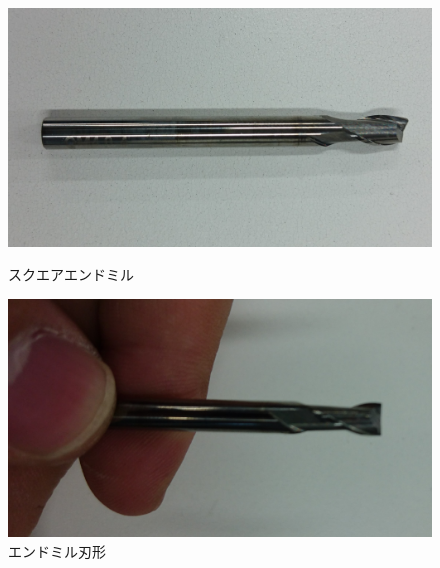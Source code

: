 \documentclass[b5paper, 9pt, twocolumn, titlepage,openany]{jsbook}%
\begin{document}
\begin{figure}[tbh]
  \begin{center}
    \begin{minipage}{0.4\columnwidth}
      \includegraphics[width=\columnwidth]{endmill.jpg}
      \caption{スクエアエンドミル    \label{endmill1}}
    \end{minipage}
    \hspace{0.05\columnwidth}
    \begin{minipage}{0.4\columnwidth}
      \includegraphics[width=\columnwidth]{endmill_side.jpg}
      \caption{エンドミル刃形    \label{endmill2}}
    \end{minipage}
  \end{center}
\end{figure}

\end{document}

